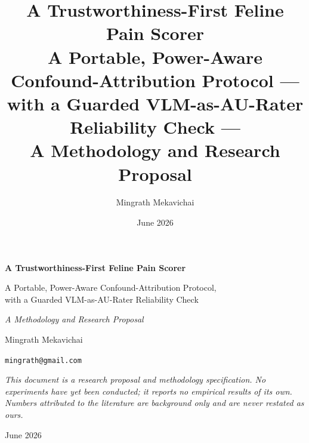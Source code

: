 \documentclass[11pt,a4paper]{report}
\title{%
  \textbf{A Trustworthiness-First Feline Pain Scorer}\\[0.4em]
  \large A Portable, Power-Aware Confound-Attribution Protocol ---\\
  with a Guarded VLM-as-AU-Rater Reliability Check ---\\
  A Methodology and Research Proposal}
\author{Mingrath Mekavichai}
\date{June 2026}
\begin{document}
\begin{titlepage}
\centering
\vspace*{2.5cm}

{\LARGE\bfseries A Trustworthiness-First Feline Pain Scorer\par}
\vspace{0.8em}
{\large A Portable, Power-Aware Confound-Attribution Protocol,\\
with a Guarded VLM-as-AU-Rater Reliability Check\par}
\vspace{0.4em}
{\large\itshape A Methodology and Research Proposal\par}

\vfill

{\large Mingrath Mekavichai\par}
\vspace{0.6em}
{\normalsize \texttt{mingrath@gmail.com}\par}

\vfill

{\normalsize
\begin{minipage}{0.82\textwidth}
\centering\itshape
This document is a research proposal and methodology specification. No
experiments have yet been conducted; it reports no empirical results of its own.
Numbers attributed to the literature are background only and are never restated
as ours.
\end{minipage}\par}

\vfill

{\large June 2026\par}
\end{titlepage}




\tableofcontents
\listoffigures
\listoftables

\clearpage
{}












\end{document}
